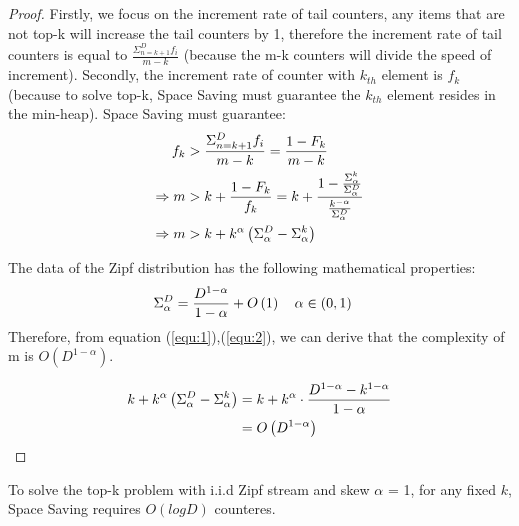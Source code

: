 \begin{proof}
   Firstly, we focus on the increment rate of tail counters, any items that are not top-k will increase the tail counters by 1, therefore the increment rate of tail counters is equal to $\frac{\Sigma_{n=k+1}^D{f_i}}{m-k}$ (because the m-k counters will divide the speed of increment). Secondly, the increment rate of counter with $k_{th}$ element is $f_k$(because to solve top-k, Space Saving must guarantee the $k_{th}$ element resides in the min-heap).
   Space Saving must guarantee:
\begin{equation}
\begin{aligned}
\centering
    \label{equ:1}
    f_k  &> \frac{\Sigma_{n=k+1}^D{f_i}}{m-k} = \frac{1-F_k}{m-k}\\
    \Rightarrow m &> k + \frac{1-F_k}{f_k} = k + \frac{1-\frac{\Sigma_\alpha^k}{\Sigma_\alpha^D}}{\frac{k^{-\alpha}}{\Sigma_\alpha^D}}\\
    \Rightarrow m &> k + k^\alpha \left(\Sigma_\alpha^D-\Sigma_\alpha^k\right)
\end{aligned}
\end{equation}

The data of the Zipf distribution has the following mathematical properties:\\
\begin{equation}
\begin{aligned}
\centering
    \label{equ:2}
    \Sigma_\alpha^D &= \frac{D^{1-\alpha}}{1-\alpha} + O\left(1\right)\quad\alpha \in \left(0, 1\right)
\end{aligned}
\end{equation}
Therefore, from equation (\ref{equ:1}),(\ref{equ:2}), we can derive that the complexity of m is $O(D^{1-\alpha})$.

\begin{equation}
\begin{aligned}
\centering
\label{equ:3}
k + k^\alpha \left(\Sigma_\alpha^D-\Sigma_\alpha^k\right) &= k + k^\alpha\cdot \frac{D^{1-\alpha}-k^{1-\alpha}}{1-\alpha} \\
&= O\left(D^{1-\alpha}\right)
\end{aligned}
\end{equation}

\end{proof}

\begin{theorem}
	To solve the top-k problem with i.i.d Zipf stream and skew $\alpha$ = 1, for any fixed $k$, Space Saving requires $O(logD)$ counteres.
\end{theorem}

